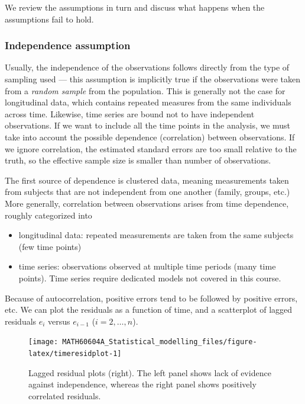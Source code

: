 \documentclass[
  11pt,
  letterpaper,
]{book}
\providecommand{\tightlist}{%
  \setlength{\itemsep}{0pt}\setlength{\parskip}{0pt}}
\theoremstyle{definition}
\theoremstyle{definition}
\theoremstyle{definition}
\theoremstyle{remark}
\begin{document}
We review the assumptions in turn and discuss what happens when the assumptions fail to hold.

\hypertarget{independence-assumption}{%
\subsubsection{Independence assumption}\label{independence-assumption}}

Usually, the independence of the observations follows directly from the type of sampling used --- this assumption is implicitly true if the observations were taken from a \emph{random sample} from the population. This is generally not the case for longitudinal data, which contains repeated measures from the same individuals across time. Likewise, time series are bound not to have independent observations. If we want to include all the time points in the analysis, we must take into account the possible dependence (correlation) between observations. If we ignore correlation, the estimated standard errors are too small relative to the truth, so the effective sample size is smaller than number of observations.

The first source of dependence is clustered data, meaning measurements taken from subjects that are not independent from one another (family, groups, etc.)
More generally, correlation between observations arises from time dependence, roughly categorized into

\begin{itemize}
\tightlist
\item
  longitudinal data: repeated measurements are taken from the same subjects (few time points)
\item
  time series: observations observed at multiple time periods (many time points). Time series require dedicated models not covered in this course.
\end{itemize}

Because of autocorrelation, positive errors tend to be followed by positive errors, etc. We can plot the residuals as a function of time, and a scatterplot of lagged residuals \(e_i\) versus \(e_{i-1}\) (\(i=2, \ldots, n\)).

\begin{figure}

{\centering \texttt{[image: MATH60604A\_Statistical\_modelling\_files/figure-latex/timeresidplot-1]} 

}

\caption{Lagged residual plots (right). The left panel shows lack of evidence against independence, whereas the right panel shows positively correlated residuals.}\label{fig:timeresidplot}
\end{figure}
\end{document}
